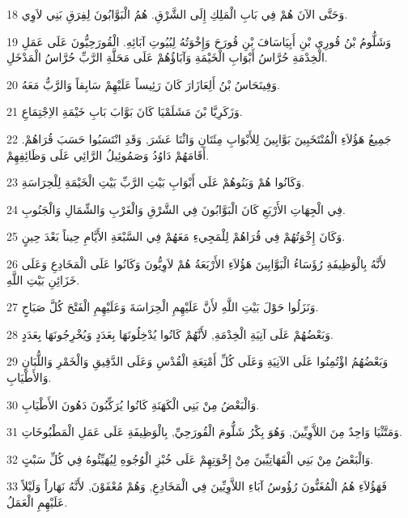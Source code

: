 \par 18 وَحَتَّى الآنَ هُمْ فِي بَابِ الْمَلِكِ إِلَى الشَّرْقِ. هُمُ الْبَوَّابُونَ لِفِرَقِ بَنِي لاَوِي.
\par 19 وَشَلُّومُ بْنُ قُورِي بْنِ أَبِيَاسَافَ بْنِ قُورَحَ وَإِخْوَتُهُ لِبُيُوتِ آبَائِهِ. الْقُورَحِيُّونَ عَلَى عَمَلِ الْخِدْمَةِ حُرَّاسُ أَبْوَابِ الْخَيْمَةِ وَآبَاؤُهُمْ عَلَى مَحَلَّةِ الرَّبِّ حُرَّاسُ الْمَدْخَلِ.
\par 20 وَفِينَحَاسُ بْنُ أَلِعَازَارَ كَانَ رَئِيساً عَلَيْهِمْ سَابِقاً وَالرَّبُّ مَعَهُ.
\par 21 وَزَكَرِيَّا بْنَ مَشَلَمْيَا كَانَ بَوَّابَ بَابِ خَيْمَةِ الاِجْتِمَاعِ.
\par 22 جَمِيعُ هَؤُلاَءِ الْمُنْتَخَبِينَ بَوَّابِينَ لِلأَبْوَابِ مِئَتَانِ وَاثْنَا عَشَرَ, وَقَدِ انْتَسَبُوا حَسَبَ قُرَاهُمْ. أَقَامَهُمْ دَاوُدُ وَصَمُوئِيلُ الرَّائِي عَلَى وَظَائِفِهِمْ.
\par 23 وَكَانُوا هُمْ وَبَنُوهُمْ عَلَى أَبْوَابِ بَيْتِ الرَّبِّ بَيْتِ الْخَيْمَةِ لِلْحِرَاسَةِ.
\par 24 فِي الْجِهَاتِ الأَرْبَعِ كَانَ الْبَوَّابُونَ فِي الشَّرْقِ وَالْغَرْبِ وَالشِّمَالِ وَالْجَنُوبِ.
\par 25 وَكَانَ إِخْوَتُهُمْ فِي قُرَاهُمْ لِلْمَجِيءِ مَعَهُمْ فِي السَّبْعَةِ الأَيَّامِ حِيناً بَعْدَ حِينٍ.
\par 26 لأَنَّهُ بِالْوَظِيفَةِ رُؤَسَاءُ الْبَوَّابِينَ هَؤُلاَءِ الأَرْبَعَةُ هُمْ لاَوِيُّونَ وَكَانُوا عَلَى الْمَخَادِعِ وَعَلَى خَزَائِنِ بَيْتِ اللَّهِ.
\par 27 وَنَزَلُوا حَوْلَ بَيْتِ اللَّهِ لأَنَّ عَلَيْهِمِ الْحِرَاسَةَ وَعَلَيْهِمِ الْفَتْحَ كُلَّ صَبَاحٍ.
\par 28 وَبَعْضُهُمْ عَلَى آنِيَةِ الْخِدْمَةِ, لأَنَّهُمْ كَانُوا يُدْخِلُونَهَا بِعَدَدٍ وَيُخْرِجُونَهَا بِعَدَدٍ.
\par 29 وَبَعْضُهُمُ اؤْتُمِنُوا عَلَى الآنِيَةِ وَعَلَى كُلِّ أَمْتِعَةِ الْقُدْسِ وَعَلَى الدَّقِيقِ وَالْخَمْرِ وَاللُّبَانِ وَالأَطْيَابِ.
\par 30 وَالْبَعْضُ مِنْ بَنِي الْكَهَنَةِ كَانُوا يُرَكِّبُونَ دَهُونَ الأَطْيَابِ.
\par 31 وَمَتَّثْيَا وَاحِدٌ مِنَ اللاَّوِيِّينَ, وَهُوَ بِكْرُ شَلُّومَ الْقُورَحِيِّ, بِالْوَظِيفَةِ عَلَى عَمَلِ الْمَطْبُوخَاتِ.
\par 32 وَالْبَعْضُ مِنْ بَنِي الْقَهَاتِيِّينَ مِنْ إِخْوَتِهِمْ عَلَى خُبْزِ الْوُجُوهِ لِيُهَيِّئُوهُ فِي كُلِّ سَبْتٍ.
\par 33 فَهَؤُلاَءِ هُمُ الْمُغَنُّونَ رُؤُوسُ آبَاءِ اللاَّوِيِّينَ فِي الْمَخَادِعِ, وَهُمْ مُعْفَوْنَ, لأَنَّهُ نَهَاراً وَلَيْلاً عَلَيْهِمِ الْعَمَلُ.
